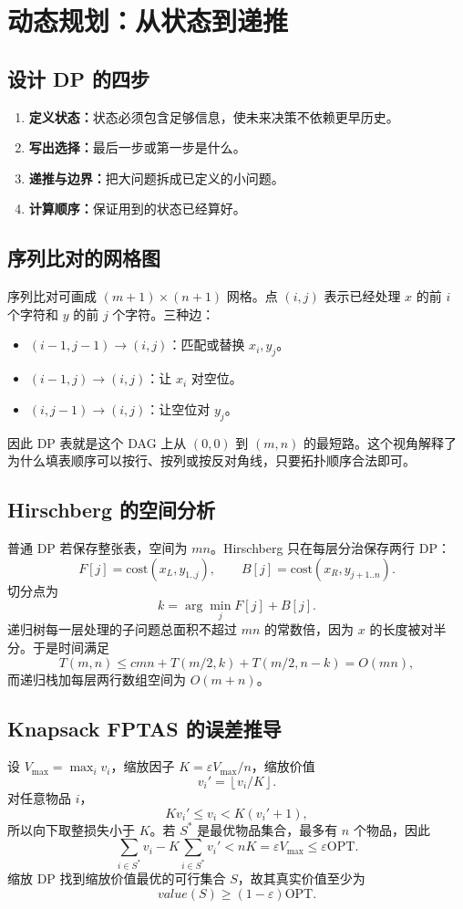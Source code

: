 \documentclass[UTF8,openany,12pt]{ctexbook}
\theoremstyle{remark}
\newcommand{\OPT}{\mathrm{OPT}}
\begin{document}
\section{动态规划：从状态到递推}
\subsection{设计 DP 的四步}
\begin{enumerate}
  \item \textbf{定义状态：}状态必须包含足够信息，使未来决策不依赖更早历史。
  \item \textbf{写出选择：}最后一步或第一步是什么。
  \item \textbf{递推与边界：}把大问题拆成已定义的小问题。
  \item \textbf{计算顺序：}保证用到的状态已经算好。
\end{enumerate}

\subsection{序列比对的网格图}
序列比对可画成 $(m+1)\times(n+1)$ 网格。点 $(i,j)$ 表示已经处理 $x$ 的前 $i$ 个字符和 $y$ 的前 $j$ 个字符。三种边：
\begin{itemize}
  \item $(i-1,j-1)\to(i,j)$：匹配或替换 $x_i,y_j$。
  \item $(i-1,j)\to(i,j)$：让 $x_i$ 对空位。
  \item $(i,j-1)\to(i,j)$：让空位对 $y_j$。
\end{itemize}
因此 DP 表就是这个 DAG 上从 $(0,0)$ 到 $(m,n)$ 的最短路。这个视角解释了为什么填表顺序可以按行、按列或按反对角线，只要拓扑顺序合法即可。

\subsection{Hirschberg 的空间分析}
普通 DP 若保存整张表，空间为 $mn$。Hirschberg 只在每层分治保存两行 DP：
\[
F[j]=\mathrm{cost}(x_L,y_{1..j}),\qquad
B[j]=\mathrm{cost}(x_R,y_{j+1..n}).
\]
切分点为
\[
k=\arg\min_j F[j]+B[j].
\]
递归树每一层处理的子问题总面积不超过 $mn$ 的常数倍，因为 $x$ 的长度被对半分。于是时间满足
\[
T(m,n)\le c mn+T(m/2,k)+T(m/2,n-k)=O(mn),
\]
而递归栈加每层两行数组空间为 $O(m+n)$。

\subsection{Knapsack FPTAS 的误差推导}
设 $V_{\max}=\max_i v_i$，缩放因子 $K=\varepsilon V_{\max}/n$，缩放价值
\[
v_i'=\left\lfloor v_i/K\right\rfloor.
\]
对任意物品 $i$，
\[
K v_i'\le v_i< K(v_i'+1),
\]
所以向下取整损失小于 $K$。若 $S^*$ 是最优物品集合，最多有 $n$ 个物品，因此
\[
\sum_{i\in S^*} v_i - K\sum_{i\in S^*}v_i' < nK=\varepsilon V_{\max}\le \varepsilon \OPT.
\]
缩放 DP 找到缩放价值最优的可行集合 $S$，故其真实价值至少为
\[
value(S)\ge (1-\varepsilon)\OPT.
\]
\end{document}
